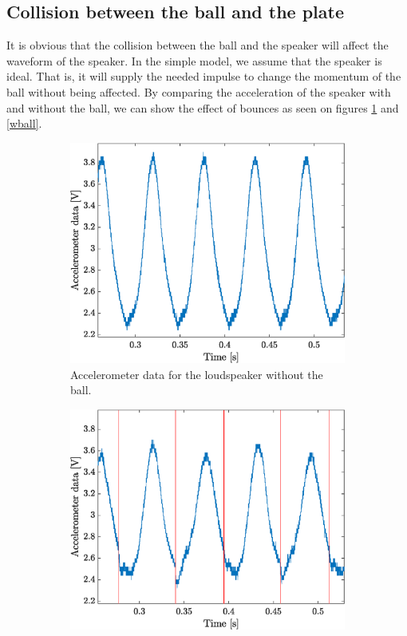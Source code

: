 \documentclass[12pt,oneside,a4paper]{article}
\numberwithin{equation}{section}
\begin{document}
{{{{\subsection{Collision between the ball and the plate}
It is obvious that the collision between the ball and the speaker will affect the waveform of the speaker. In the simple model, we assume that the speaker is ideal. That is, it will supply the needed impulse to change the momentum of the ball without being affected. By comparing the acceleration of the speaker with and without the ball, we can show the effect of bounces as seen on figures \ref{noball} and \ref{wball}. 
\begin{figure}[h]
\centering
\begin{subfigure}[t]{0.49\textwidth}
	\centering
	\includegraphics[width=\textwidth]{noball}
	\caption{Accelerometer data for the loudspeaker without the ball.}
	\label{noball}
\end{subfigure}\hfill
\begin{subfigure}[t]{0.49\textwidth}
	\centering
	\includegraphics[width=\textwidth]{wball}

\end{subfigure}
\end{figure}}}}}
\end{document}
